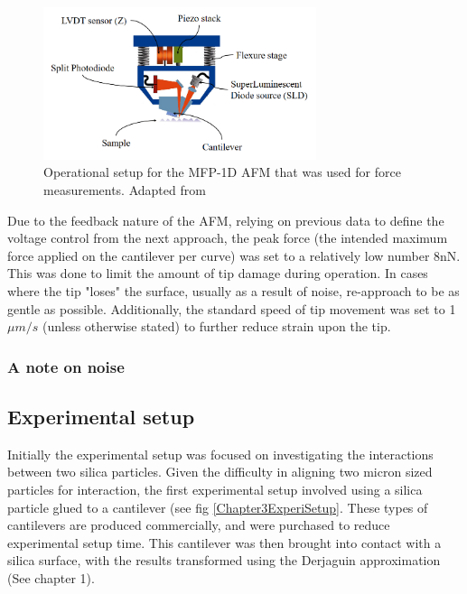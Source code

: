 \begin{figure}[h!]     %
        \begin{center}
          \includegraphics[width=80mm]{chapter2/Head.PNG}
\end{center}
\caption{Operational setup for the MFP-1D AFM that was used for force measurements. Adapted from \cite{AFMTalk}} %
\label{fig:Head.jpg}                 %
\end{figure}


Due to the feedback nature of the AFM, relying on previous data to define the voltage control from the next approach, the peak force (the intended maximum force applied on the cantilever per curve) was set to a relatively low number 8nN. This was done to limit the amount of tip damage during operation. In cases where the tip "loses" the surface, usually as a result of noise,  re-approach to be as gentle as possible. Additionally, the standard speed of tip movement was set to 1$\mu m/s$ (unless otherwise stated) to further reduce strain upon the tip.

\subsubsection{A note on noise}



\subsection{Experimental setup}


Initially the experimental setup was focused on investigating the interactions between two silica particles. Given the difficulty in aligning two micron sized particles for interaction, the first experimental setup involved using a silica particle glued to a cantilever (see fig \ref{Chapter3ExperiSetup}. These types of cantilevers are produced commercially, and were purchased to reduce experimental setup time. This cantilever was then brought into contact with a silica surface, with the results transformed using the Derjaguin approximation (See chapter 1). 

